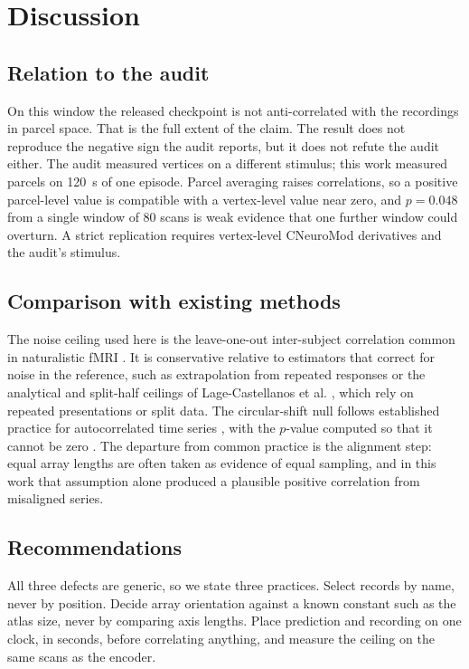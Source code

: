 \documentclass[preprint,12pt]{elsarticle}
\begin{document}
\section{Discussion}
\label{sec:discussion}

\subsection{Relation to the audit}

On this window the released checkpoint is not anti-correlated with the recordings in parcel
space. That is the full extent of the claim. The result does not reproduce the negative sign
the audit reports, but it does not refute the audit either. The audit measured vertices on a
different stimulus; this work measured parcels on 120~s of one episode. Parcel averaging raises
correlations, so a positive parcel-level value is compatible with a vertex-level value near
zero, and $p = 0.048$ from a single window of 80 scans is weak evidence that one further
window could overturn. A strict replication requires vertex-level CNeuroMod derivatives and
the audit's stimulus.

\subsection{Comparison with existing methods}

The noise ceiling used here is the leave-one-out inter-subject correlation common in
naturalistic fMRI \cite{nastase2019}. It is conservative relative to estimators that correct
for noise in the reference, such as extrapolation from repeated responses \cite{hsu2004} or the
analytical and split-half ceilings of Lage-Castellanos et al. \cite{lagecastellanos2019},
which rely on repeated presentations or split data. The
circular-shift null follows established practice for autocorrelated time series
\cite{nastase2019}, with the $p$-value computed so that it cannot be zero \cite{phipson2010}.
The departure from common practice is the alignment step: equal array lengths are often
taken as evidence of equal sampling, and in this work that assumption alone produced a
plausible positive correlation from misaligned series.

\subsection{Recommendations}

All three defects are generic, so we state three practices. Select records by name, never by
position. Decide array orientation against a known constant such as the atlas size, never by
comparing axis lengths. Place prediction and recording on one clock, in seconds, before
correlating anything, and measure the ceiling on the same scans as the encoder.
\end{document}
